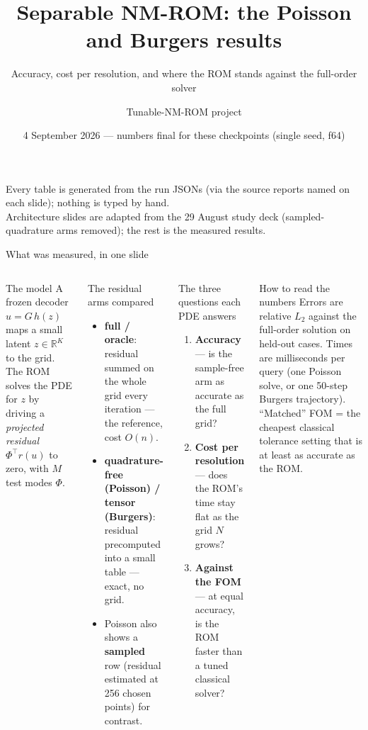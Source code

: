 \documentclass[10pt,aspectratio=169]{beamer}
\title{Separable NM-ROM: the Poisson and Burgers results}
\subtitle{Accuracy, cost per resolution, and where the ROM stands against the full-order solver}
\author{Tunable-NM-ROM project}
\date{4 September 2026 --- numbers final for these checkpoints (single seed, f64)}
\newcommand{\T}{^{\top}}
\newcommand{\R}{\mathbb{R}}
\begin{document}
\begin{frame}
  \titlepage
  \begin{center}\scriptsize
    Every table is generated from the run JSONs (via the source reports named on each slide); nothing is typed by hand.\\
    Architecture slides are adapted from the 29 August study deck (sampled-quadrature arms removed); the rest is the measured results.
  \end{center}
\end{frame}

\begin{frame}{What was measured, in one slide}
  \footnotesize
  \begin{columns}[T]
    \begin{block}{The model}
      A frozen decoder $u = G\,h(z)$ maps a small latent $z\in\R^{K}$ to the grid.
      The ROM solves the PDE for $z$ by driving a \emph{projected residual} $\Phi\T r(u)$ to zero, with $M$ test modes $\Phi$.
    \end{block}
    \begin{block}{The residual arms compared}
      \begin{itemize}
        \item \textbf{full / oracle}: residual summed on the whole grid every iteration --- the reference, cost $O(n)$.
        \item \textbf{quadrature-free (Poisson) / tensor (Burgers)}: residual precomputed into a small table --- exact, no grid.
        \item Poisson also shows a \textbf{sampled} row (residual estimated at 256 chosen points) for contrast.
      \end{itemize}
    \end{block}
    \begin{exampleblock}{The three questions each PDE answers}
      \begin{enumerate}
        \item \textbf{Accuracy} --- is the sample-free arm as accurate as the full grid?
        \item \textbf{Cost per resolution} --- does the ROM's time stay flat as the grid $N$ grows?
        \item \textbf{Against the FOM} --- at equal accuracy, is the ROM faster than a tuned classical solver?
      \end{enumerate}
    \end{exampleblock}
    \begin{alertblock}{How to read the numbers}
      Errors are relative $L_2$ against the full-order solution on held-out cases.
      Times are milliseconds per query (one Poisson solve, or one 50-step Burgers trajectory).
      ``Matched'' FOM = the cheapest classical tolerance setting that is at least as accurate as the ROM.
    \end{alertblock}
  \end{columns}
\end{frame}
\end{document}
